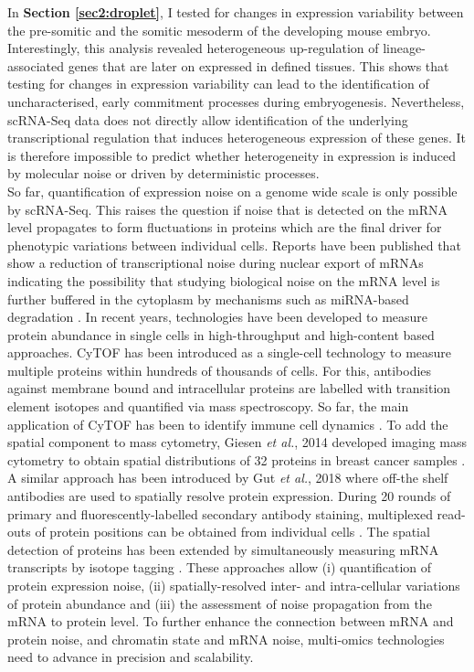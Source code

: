 In \textbf{Section \ref{sec2:droplet}}, I tested for changes in expression variability between the pre-somitic and the somitic mesoderm of the developing mouse embryo. Interestingly, this analysis revealed heterogeneous up-regulation of lineage-associated genes that are later on expressed in defined tissues. This shows that testing for changes in expression variability can lead to the identification of uncharacterised, early commitment processes during embryogenesis. Nevertheless, scRNA-Seq data does not directly allow identification of the underlying transcriptional regulation that induces heterogeneous expression of these genes. It is therefore impossible to predict whether heterogeneity in expression is induced by molecular noise or driven by deterministic processes.\\

So far, quantification of expression noise on a genome wide scale is only possible by scRNA-Seq. This raises the question if noise that is detected on the mRNA level propagates to form fluctuations in proteins which are the final driver for phenotypic variations between individual cells. Reports have been published that show a reduction of transcriptional noise during nuclear export of mRNAs \citep{Battich2015a, BaharHalpern2015a} indicating the possibility that studying biological noise on the mRNA level is further buffered in the cytoplasm by mechanisms such as miRNA-based degradation \citep{Schmiedel2015}. In recent years, technologies have been developed to measure protein abundance in single cells in high-throughput and high-content based approaches. \Gls{CyTOF} has been introduced as a single-cell technology to measure multiple proteins within hundreds of thousands of cells. For this, antibodies against membrane bound and intracellular proteins are labelled with transition element isotopes and quantified via mass spectroscopy. So far, the main application of CyTOF has been to identify immune cell dynamics \citep{Bendall2011}. To add the spatial component to mass cytometry, Giesen \emph{et al.}, 2014 developed imaging mass cytometry to obtain spatial distributions of 32 proteins in breast cancer samples \citep{Giesen2014}. A similar approach has been introduced by Gut \emph{et al.}, 2018 where off-the shelf antibodies are used to spatially resolve protein expression. During 20 rounds of primary and fluorescently-labelled secondary antibody staining, multiplexed read-outs of protein positions can be obtained from individual cells \citep{Gut2018}. The spatial detection of proteins has been extended by simultaneously measuring mRNA transcripts by isotope tagging \cite{Schulz2018}. These approaches allow (i) quantification of protein expression noise, (ii) spatially-resolved inter- and intra-cellular variations of protein abundance and (iii) the assessment of noise propagation from the mRNA to protein level. To further enhance the connection between mRNA and protein noise, and chromatin state and mRNA noise, multi-omics technologies need to advance in precision and scalability.

